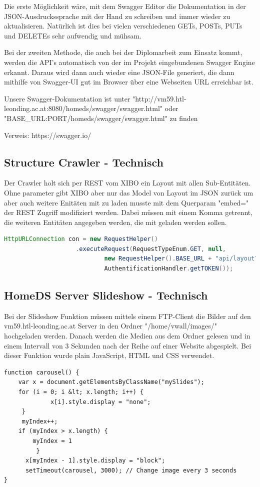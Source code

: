 Die erste Möglichkeit wäre, mit dem Swagger Editor die Dokumentation in der JSON-Ausdruckssprache mit der Hand zu schreiben und immer wieder zu aktualisieren. Natürlich ist dies bei vielen verschiedenen GETs, POSTs, PUTs und DELETEs sehr aufwendig und mühsam.

Bei der zweiten Methode, die auch bei der Diplomarbeit zum Einsatz kommt, werden die API's automatisch von der im Projekt eingebundenen Swagger Engine erkannt. Daraus wird dann auch wieder eine JSON-File generiert, die dann mithilfe von Swagger-UI gut im Browser über eine Webseiten URL erreichbar ist.

Unsere Swagger-Dokumentation ist unter "http://vm59.htl-leonding.ac.at:8080/homeds/swagger/swagger.html" oder "BASE_URL:PORT/homeds/swagger/swagger.html" zu finden


Verweis: https://swagger.io/

\subsection{Structure Crawler - Technisch}\label{sec:structurecrawlertechnical}
Der Crawler holt sich per REST vom XIBO ein Layout mit allen Sub-Entitäten. Ohne parameter gibt XIBO aber nur das Model von Layout im JSON zurück um aber auch weitere Enitäten mit zu laden musste mit dem Querparam  "embed=" der REST Zugriff modifiziert werden. Dabei müssen mit einem Komma getrennt, die weiteren Entitäten angegeben werden, die mit geladen werden sollen.

\begin{lstlisting}[language=Java, caption={Crawler GET Request}]
HttpURLConnection con = new RequestHelper()
                    .executeRequest(RequestTypeEnum.GET, null,
                            new RequestHelper().BASE_URL + "api/layout?embed=regions,playlists,widgets,widgetOptions"+query,
                            AuthentificationHandler.getTOKEN());
\end{lstlisting}

\subsection{HomeDS Server Slideshow - Technisch}\label{sec:slideshowtechnical}
Bei der Slideshow Funktion müssen mittels einem FTP-Client die Bilder auf den vm59.htl-leonding.ac.at Server in den Ordner "/home/vwall/images/" hochgeladen werden. Danach werden die Medien aus dem Ordner gelesen und in einem Intervall von 3 Sekunden nach der Reihe auf einer Website abgespielt. Bei dieser Funktion wurde plain JavaScript, HTML und CSS verwendet.

\begin{lstlisting}[caption=Carousel JavaScript]
function carousel() {
    var x = document.getElementsByClassName("mySlides");
    for (i = 0; i &lt; x.length; i++) {
    		 x[i].style.display = "none";
  	 }
     myIndex++;
   	if (myIndex > x.length) {
   		myIndex = 1
    	 }
      x[myIndex - 1].style.display = "block";
      setTimeout(carousel, 3000); // Change image every 3 seconds
}
\end{lstlisting}
